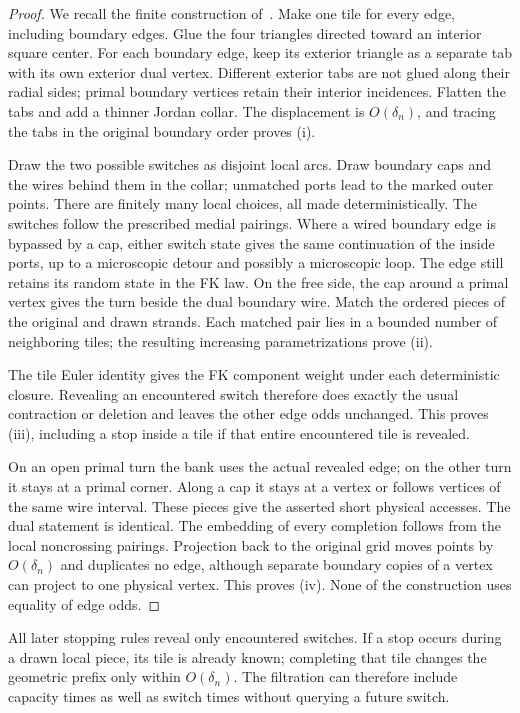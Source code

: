 \begin{proof}
We recall the finite construction of~\cite[Lemma ``A compatible simple
drawing'']{C}. Make one tile for every edge, including boundary edges.
Glue the four triangles directed toward an interior square center.
For each boundary edge, keep its exterior triangle as a separate tab
with its own exterior dual vertex. Different exterior tabs are not
glued along their radial sides; primal boundary vertices retain their
interior incidences. Flatten the tabs and add a thinner Jordan collar.
The displacement is $O(\delta_n)$, and tracing the tabs in the original
boundary order proves (i).

Draw the two possible switches as disjoint local arcs. Draw boundary
caps and the wires behind them in the collar; unmatched ports lead to
the marked outer points. There are finitely many local choices, all
made deterministically. The switches follow the prescribed medial
pairings. Where a wired boundary edge is bypassed by a cap, either
switch state gives the same continuation of the inside ports, up to
a microscopic detour and possibly a microscopic loop. The edge still
retains its random state in the FK law. On the free side, the cap
around a primal vertex gives the turn beside the dual boundary wire.
Match the ordered pieces of the original and drawn strands. Each
matched pair lies in a bounded number of neighboring tiles; the
resulting increasing parametrizations prove (ii).

The tile Euler identity gives the FK component weight under each
deterministic closure. Revealing an encountered switch therefore does
exactly the usual contraction or deletion and leaves the other edge
odds unchanged. This proves (iii), including a stop inside a tile if
that entire encountered tile is revealed.

On an open primal turn the bank uses the actual revealed edge; on the
other turn it stays at a primal corner. Along a cap it stays at a
vertex or follows vertices of the same wire interval. These pieces
give the asserted short physical accesses. The dual statement is
identical. The embedding of every completion follows from the local
noncrossing pairings. Projection back to the original grid moves
points by $O(\delta_n)$ and duplicates no edge, although separate
boundary copies of a vertex can project to one physical vertex.
This proves (iv). None of the construction uses equality of edge odds.
\end{proof}

All later stopping rules reveal only encountered switches. If a stop
occurs during a drawn local piece, its tile is already known; completing
that tile changes the geometric prefix only within $O(\delta_n)$.
The filtration can therefore include capacity times as well as
switch times without querying a future switch.
